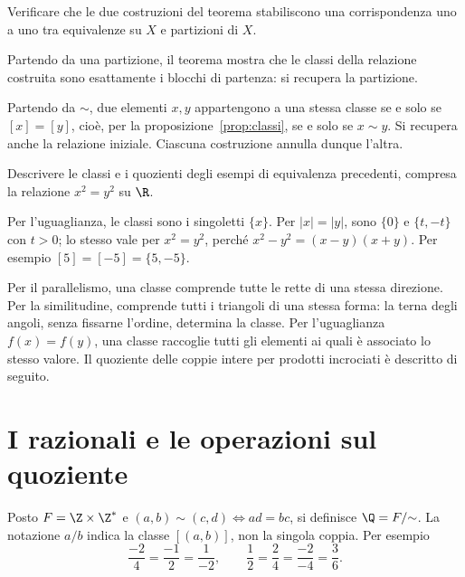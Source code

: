 \begin{esercizio}
Verificare che le due costruzioni del teorema stabiliscono una corrispondenza uno a uno tra equivalenze su $X$ e partizioni di $X$.
\end{esercizio}
\begin{svolgimento}
Partendo da una partizione, il teorema mostra che le classi della relazione costruita sono esattamente i blocchi di partenza: si recupera la partizione.

Partendo da $\sim$, due elementi $x,y$ appartengono a una stessa classe se e solo se $[x]=[y]$, cioè, per la proposizione~\ref{prop:classi}, se e solo se $x\sim y$. Si recupera anche la relazione iniziale. Ciascuna costruzione annulla dunque l'altra.
\end{svolgimento}

\begin{esercizio}
Descrivere le classi e i quozienti degli esempi di equivalenza precedenti, compresa la relazione $x^2=y^2$ su $\R$.
\end{esercizio}
\begin{svolgimento}
Per l'uguaglianza, le classi sono i singoletti $\{x\}$. Per $|x|=|y|$, sono $\{0\}$ e $\{t,-t\}$ con $t>0$; lo stesso vale per $x^2=y^2$, perché $x^2-y^2=(x-y)(x+y)$. Per esempio $[5]=[-5]=\{5,-5\}$.

Per il parallelismo, una classe comprende tutte le rette di una stessa direzione. Per la similitudine, comprende tutti i triangoli di una stessa forma: la terna degli angoli, senza fissarne l'ordine, determina la classe. Per l'uguaglianza $f(x)=f(y)$, una classe raccoglie tutti gli elementi ai quali è associato lo stesso valore. Il quoziente delle coppie intere per prodotti incrociati è descritto di seguito.
\end{svolgimento}

\section{I razionali e le operazioni sul quoziente}
\begin{definizione}
Posto $F=\Z\times\Z^*$ e $(a,b)\sim(c,d)\iff ad=bc$, si definisce $\Q=F/{\sim}$. La notazione $a/b$ indica la classe $[(a,b)]$, non la singola coppia. Per esempio
\[
\frac{-2}{4}=\frac{-1}{2}=\frac{1}{-2},\qquad
\frac12=\frac24=\frac{-2}{-4}=\frac36.
\]
\end{definizione}

